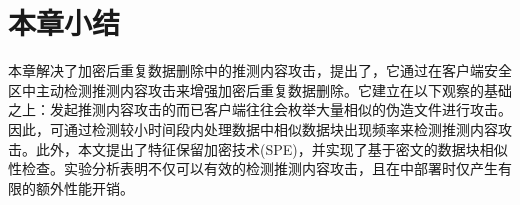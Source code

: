 \section{本章小结}
\label{sec:featurespy-conclusion}
本章解决了加密后重复数据删除中的推测内容攻击，提出了\sysnameF，它通过在客户端安全区中主动检测推测内容攻击来增强加密后重复数据删除。它建立在以下观察的基础之上：发起推测内容攻击的而已客户端往往会枚举大量相似的伪造文件进行攻击。因此，可通过检测较小时间段内处理数据中相似数据块出现频率来检测推测内容攻击。此外，本文提出了特征保留加密技术(SPE)，并实现了基于密文的数据块相似性检查。实验分析表明\sysnameF 不仅可以有效的检测推测内容攻击，且在\sysnameS 中部署时仅产生有限的额外性能开销。
